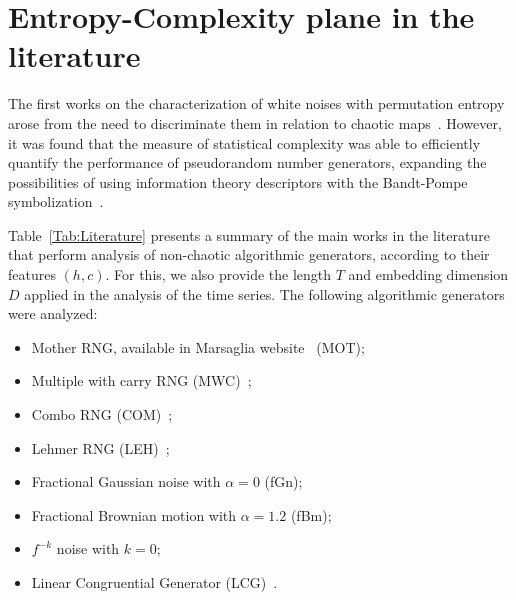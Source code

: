 \section{Entropy-Complexity plane in the literature}

The first works on the characterization of white noises with permutation entropy arose from the need to discriminate them in relation to chaotic maps~\cites{rosso2013characterization, xiong2020complexity, olivares2012contrasting}.
However, it was found that the measure of statistical complexity was able to efficiently quantify the performance of pseudorandom number generators, expanding the possibilities of using information theory descriptors with the Bandt-Pompe symbolization~\cites{larrondo2002statistical, gonzalez2005statistical}.

Table~\ref{Tab:Literature} presents a summary of the main works in the literature that perform analysis of non-chaotic algorithmic generators, according to their features $(h, c)$.
For this, we also provide the length $T$ and embedding dimension $D$ applied in the analysis of the time series.
The following algorithmic generators were analyzed:
\begin{itemize}
    \item Mother RNG, available in Marsaglia website~\cite{marsaglia1994yet} (MOT);
    \item Multiple with carry RNG (MWC)~\cite{marsaglia1994yet};
    \item Combo RNG (COM)~\cite{marsaglia1994yet};
    \item Lehmer RNG (LEH)~\cite{payne1969coding};
    \item Fractional Gaussian noise with $\alpha = 0$ (fGn);
    \item Fractional Brownian motion with $\alpha = 1.2$ (fBm);
    \item $f^{-k}$ noise with $k = 0$;
    \item Linear Congruential Generator (LCG)~\cite{knuth1997sorting}.
\end{itemize}


